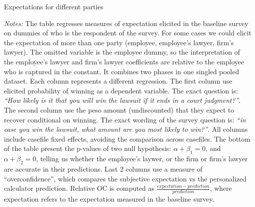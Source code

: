 \documentclass[9pt]{beamer}
\begin{document}
\begin{frame}{Expectations for different parties}
\begin{table}[H]
    \label{prediction_cases}
    \begin{center}
       \scriptsize{}
    \end{center}
\end{table}
    \footnotesize    
    \textit{Notes:} 
     The table regresses measures of expectation elicited in the baseline survey on dummies of who is the respondent of the survey. For some cases we could elicit the expectation of more than one party (employee, employee's lawyer, firm's lawyer). The omitted variable is the employee dummy, so the interpretation of the employee's lawyer and firm's lawyer coefficients are relative to the employee who is captured in the constant. It combines two phases in one singled pooled dataset. Each column represents a different regression. The first column use elicited probability of winning as a dependent variable. The exact question is: \textit{``How likely is it that you will win the lawsuit if it ends in a court judgment?''}. The second column use the peso amount (undiscounted) that they expect to recover conditional on winning. The exact wording of the survey question is: \textit{``in case you win the lawsuit, what amount are you most likely to win?''}.  All columns include casefile fixed effects, avoiding the comparison across casefiles. The bottom of the table present the p-values of two null hypothesis:  $\alpha + \beta_1=0$, and $\alpha + \beta_2=0$, telling us whether the employee's laywer, or the firm or firm's lawyer are accurate in their predictions. Last 2 columns use a measure of ``overconfidence'', which compares the subjective expectation vs the personalized calculator prediction. Relative OC is computed as $\frac{expectation-prediction}{prediction}$, where expectation refers to the expectation measured in the baseline survey.
\end{frame}
\end{document}
